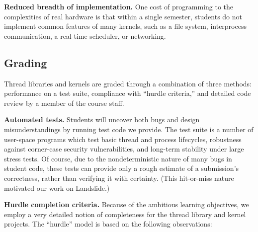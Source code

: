 \textbf{Reduced breadth of implementation.}
One cost of programming to the complexities of
real hardware is that
within %
a single semester,
students do not %
implement common features of many kernels,
such as a file system, interprocess communication,
a real-time scheduler,
or networking.


\subsection{Grading}
\label{sec:grading}

Thread libraries and kernels
are graded through a combination
of three methods:
performance on a test suite,
compliance with ``hurdle criteria,''
and detailed code review by a member of the course staff.

\textbf{Automated tests.}
Students will uncover both bugs
and design misunderstandings by running test code we
provide.
The test suite is a number of user-space programs
which test
basic thread and process lifecycles, robustness
against corner-case security vulnerabilities, and long-term stability
under large stress tests.
%
%
Of course, due to the nondeterministic nature of many bugs in student code,
these tests can provide only a rough estimate of a submission's correctness,
rather than verifying it with certainty.
(This hit-or-miss nature motivated our work on Landslide.)

\textbf{Hurdle completion criteria.}
Because of the ambitious learning objectives,
we employ a very detailed notion of completeness
for the thread library and kernel projects.
The ``hurdle'' model is based on the following observations:

